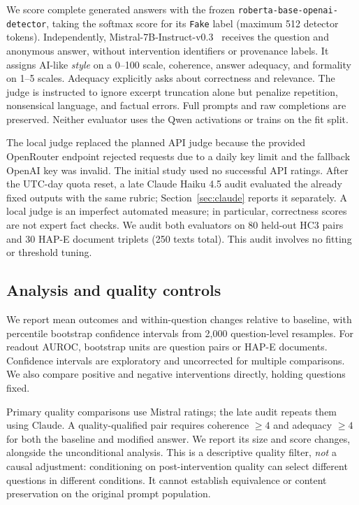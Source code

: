\documentclass[10pt,twocolumn]{article}
\begin{document}
We score complete generated answers with the frozen \texttt{roberta-base-openai-detector}, taking the softmax score for its \texttt{Fake} label (maximum 512 detector tokens). Independently, Mistral-7B-Instruct-v0.3~\cite{jiang2023} receives the question and anonymous answer, without intervention identifiers or provenance labels. It assigns AI-like \emph{style} on a 0--100 scale, coherence, answer adequacy, and formality on 1--5 scales. Adequacy explicitly asks about correctness and relevance. The judge is instructed to ignore excerpt truncation alone but penalize repetition, nonsensical language, and factual errors. Full prompts and raw completions are preserved. Neither evaluator uses the Qwen activations or trains on the fit split.

The local judge replaced the planned API judge because the provided OpenRouter endpoint rejected requests due to a daily key limit and the fallback OpenAI key was invalid. The initial study used no successful API ratings. After the UTC-day quota reset, a late Claude Haiku 4.5 audit evaluated the already fixed outputs with the same rubric; Section~\ref{sec:claude} reports it separately. A local judge is an imperfect automated measure; in particular, correctness scores are not expert fact checks. We audit both evaluators on 80 held-out HC3 pairs and 30 HAP-E document triplets (250 texts total). This audit involves no fitting or threshold tuning.

\subsection{Analysis and quality controls}
We report mean outcomes and within-question changes relative to baseline, with percentile bootstrap confidence intervals from 2,000 question-level resamples. For readout AUROC, bootstrap units are question pairs or HAP-E documents. Confidence intervals are exploratory and uncorrected for multiple comparisons. We also compare positive and negative interventions directly, holding questions fixed.

Primary quality comparisons use Mistral ratings; the late audit repeats them using Claude. A quality-qualified pair requires coherence $\geq4$ and adequacy $\geq4$ for both the baseline and modified answer. We report its size and score changes, alongside the unconditional analysis. This is a descriptive quality filter, \emph{not} a causal adjustment: conditioning on post-intervention quality can select different questions in different conditions. It cannot establish equivalence or content preservation on the original prompt population.
\end{document}
